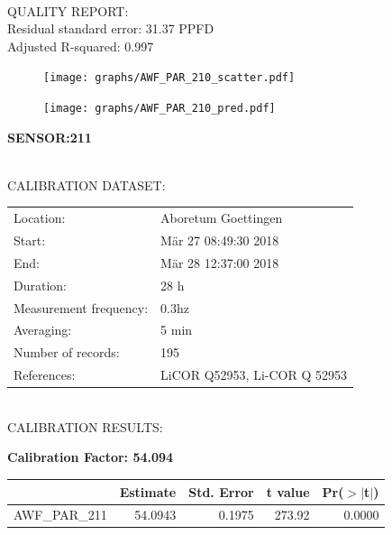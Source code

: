 \documentclass[oneside]{report}
\begin{document}
\hrulefill\\
QUALITY REPORT:\\
Residual standard error: 31.37 PPFD\\
Adjusted R-squared: 0.997



\begin{figure}[H]
  \centering
  \texttt{[image: graphs/AWF\_PAR\_210\_scatter.pdf]}
\end{figure}




\begin{figure}[H]
  \centering
  \texttt{[image: graphs/AWF\_PAR\_210\_pred.pdf]}
\end{figure}

\pagebreak


\begin{center}
\large{\textbf{SENSOR:211}}\\
\end{center}

\hrulefill\\
CALIBRATION DATASET:\\
\begin{table}[h!]
  \centering
  \label{tab:table1}
  \begin{tabular}{ll}
    Location: & Aboretum Goettingen\\ 
    
    
    Start:  & Mär 27 08:49:30 2018 \\
    End:   & Mär 28 12:37:00 2018\\ 
    Duration: & 28 h\\
    Measurement frequency: & 0.3hz\\
    Averaging:  &5 min\\
    Number of records: & 195 \\
    References: & LiCOR Q52953, Li-COR Q 52953 \\
  \end{tabular}
\end{table}

\hrulefill\\
CALIBRATION RESULTS:\\


\begin{center}
\textbf{\large{Calibration Factor: 54.094}}\\
\end{center}
\begin{table}[ht]
\centering
\begin{tabular}{rrrrr}
  \hline
 & Estimate & Std. Error & t value & Pr($>$$|$t$|$) \\ 
  \hline
AWF\_PAR\_211 & 54.0943 & 0.1975 & 273.92 & 0.0000 \\ 
   \hline
\end{tabular}
\end{table}
\end{document}
